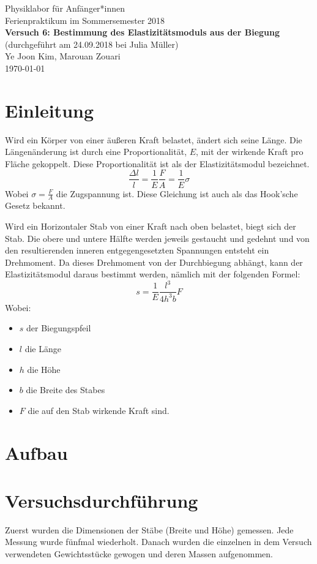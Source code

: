 \documentclass[11pt,a4paper]{article}
\begin{document}
{
	\centering 
	\large 
	Physiklabor für Anfänger*innen \\
	Ferienpraktikum im Sommersemester 2018 \\[4mm]
	\textbf{\LARGE 
		Versuch 6: Bestimmung des Elastizitätsmoduls aus der Biegung
	} \\[3mm]
	(durchgeführt am 24.09.2018 bei Julia Müller) \\
	Ye Joon Kim, Marouan Zouari\\
	\today \\[10mm]
}
\tableofcontents

\section{Einleitung}
Wird ein Körper von einer äußeren Kraft belastet, ändert sich seine Länge. Die Längenänderung ist durch eine Proportionalität, $E$, mit der wirkende Kraft pro Fläche gekoppelt. Diese Proportionalität ist als der Elastizitätsmodul bezeichnet. 
\begin{equation}
\frac{\Delta l}{l} = \frac{1}{E}\frac{F}{A} = \frac{1}{E}\sigma
\end{equation}
Wobei $\sigma = \frac{F}{A}$ die Zugspannung ist. Diese Gleichung ist auch als das Hook'sche Gesetz bekannt.

Wird ein Horizontaler Stab von einer Kraft nach oben belastet, biegt sich der Stab. Die obere und untere Hälfte werden jeweils gestaucht und gedehnt und von den resultierenden inneren entgegengesetzten Spannungen entsteht ein Drehmoment. Da dieses Drehmoment von der Durchbiegung abhängt, kann der Elastizitätsmodul daraus bestimmt werden, nämlich mit der folgenden Formel:
\begin{equation}
s = \frac{1}{E}\frac{l^3}{4h^3b}F
\end{equation}
Wobei:
\begin{itemize}
	\item $s$ der Biegungspfeil
	\item $l$ die Länge 
	\item $h$ die Höhe
	\item $b$ die Breite des Stabes
	\item $F$ die auf den Stab wirkende Kraft sind.
\end{itemize}
\section{Aufbau}

\section{Versuchsdurchführung}
Zuerst wurden die Dimensionen der Stäbe (Breite und Höhe) gemessen. Jede Messung wurde fünfmal wiederholt. Danach wurden die einzelnen in dem Versuch verwendeten Gewichtsstücke gewogen und deren Massen aufgenommen. 
\end{document}
